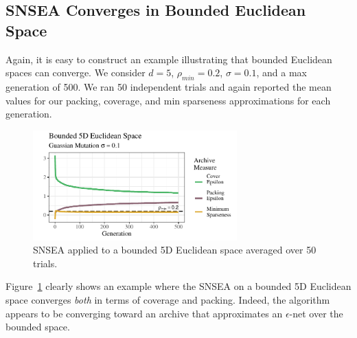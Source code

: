 \documentclass[twoside]{article}
\begin{document}
\subsection{SNSEA Converges in Bounded Euclidean Space}
\label{subsec:bounded}
Again, it is easy to construct an example illustrating that bounded Euclidean spaces can converge.  We consider $d=5$, $\rho_{min} = 0.2$, $\sigma=0.1$, and a max generation of 500.  We ran 50 independent trials and again reported the mean values for our packing, coverage, and min sparseness approximations for each generation.  
\begin{figure}[ht]
  \center\includegraphics[width=0.7\textwidth]{Figures/bounded-s01-r02-NOPOP.pdf}
  \caption{\label{fig:bounded:nopop:0103} SNSEA applied to a bounded 5D Euclidean space averaged over 50 trials.}
\end{figure}

Figure~\ref{fig:bounded:nopop:0103} clearly shows an example where the SNSEA on a bounded 5D Euclidean space converges \emph{both} in terms of coverage and packing.  Indeed, the algorithm appears to be converging toward an archive that approximates an $\epsilon$-net over the bounded space.  
\end{document}
